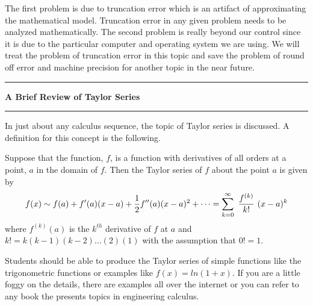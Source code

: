 \documentclass[10pt,fleqn]{article}
\begin{document}
The first problem is due to truncation error which is an artifact of
approximating the mathematical model. Truncation error in any given problem 
needs to be analyzed mathematically. The second problem is really beyond our
control since it is due to the particular computer and operating system we are
using. We will treat the problem of truncation error in this topic and save the
problem of round off error and machine precision for another topic in the near
future.
\vskip0.1in\hrule\vskip0.1in\noindent
{\bf A Brief Review of Taylor Series} 
\vskip0.1in\hrule\vskip0.1in\noindent
In just about any calculus sequence, the topic of Taylor series is discussed. A
definition for this concept is the following.
\begin{definition}
  Suppose that the function, \(f\), is a function with derivatives of all
  orders at a point, \(a\) in the domain of \(f\). Then the Taylor series of
  \(f\) about the point \(a\) is given by
  \[
    f(x) \sim f(a) + f'(a) ( x - a ) + {1\over 2} f''(a) ( x - a )^2 + \cdots
          = \sum_{k=0}^\infty\ {{f^{(k)}}\over{k!}}\ ( x - a )^k
  \]
  where \(f^{(k)}(a)\) is the \(k^{th}\) derivative of \(f\) at \(a\) and
  \(k!=k(k-1)(k-2)\ldots (2)(1)\) with the assumption that \(0!=1\).
\end{definition}
Students should be able to produce the Taylor series of simple functions like
the trigonometric functions or examples like \(f(x)=ln(1+x)\). If you are a
little foggy on the details, there are examples all over the internet or you can
refer to any book the presents topics in engineering calculus.
\end{document}
